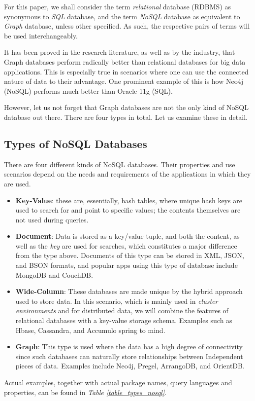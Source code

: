 \documentclass[10pt,        %
               a4paper,     %
               journal,     %
               ]{IEEEtran}
\begin{document}
For this paper, we shall consider the term \textit{relational} database (RDBMS) as synonymous to \textit{SQL} database, and the term \textit{NoSQL} database as equivalent to \textit{Graph} database, unless other specified. As such, the respective pairs of terms will be used interchangeably. \par
It has been proved in the research literature, as well as by the industry, that Graph databases perform radically better than relational databases for big data applications. \cite{IEEEpaper1:comparison} This is especially true in scenarios where one can use the connected nature of data to their advantage. One prominent example of this is how Neo4j (NoSQL) performs much better than Oracle 11g (SQL). \cite{comparison_2015} \par
However, let us not forget that Graph databases are not the only kind of NoSQL database out there. There are four types in total. Let us examine these in detail.
\subsection{Types of NoSQL Databases}
There are four different kinds of NoSQL databases. Their properties and use scenarios depend on the needs and requirements of the applications in which they are used. 
\begin{itemize}
	\item \textbf{Key-Value}: these are, essentially, hash tables, where unique hash keys are used to search for and point to specific values; the contents themselves are not used during queries.
	\item \textbf{Document}: Data is stored as a key/value tuple, and both the content, as well as the \textit{key} are used for searches, which constitutes a major difference from the type above. Documents of this type can be stored in XML, JSON, and BSON formats, and popular apps using this type of database include MongoDB and CouchDB.
	\item \textbf{Wide-Column}: These databases are made unique by the hybrid approach used to store data. In this scenario, which is mainly used in \textit{cluster environments} and for distributed data, we will combine the features of relational databases with a key-value storage schema. Examples such as Hbase, Cassandra, and Accumulo spring to mind.
	\item \textbf{Graph}: This type is used where the data has a high degree of connectivity since such databases can naturally store relationships between Independent pieces of data. Examples include Neo4j, Pregel, ArrangoDB, and OrientDB. 
\end{itemize}
Actual examples, together with actual package names, query languages and properties, can be found in \textit{Table \ref{table_types_nosql}}. \cite{IEEEpaper1:comparison}
\end{document}
